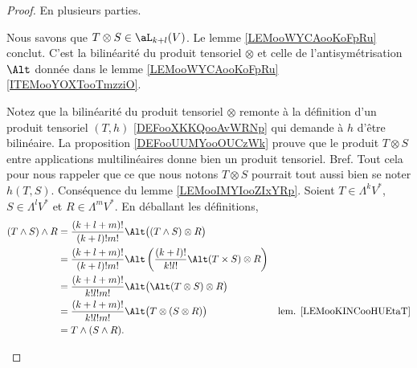 \begin{proof}
	En plusieurs parties.
	\begin{subproof}
		Nous savons que \( T\otimes S\in\aL_{k+l}(V)\). Le lemme \ref{LEMooWYCAooKoFpRu} conclut.
		C'est la bilinéarité du produit tensoriel \( \otimes\) et celle de l'antisymétrisation \( \Alt\) donnée dans le lemme \ref{LEMooWYCAooKoFpRu}\ref{ITEMooYOXTooTmzziO}.

		Notez que la bilinéarité du produit tensoriel \( \otimes\) remonte à la définition d'un produit tensoriel \( (T,h)\) \ref{DEFooXKKQooAvWRNp} qui demande à \( h\) d'être bilinéaire. La proposition \ref{DEFooUUMYooOUCzWk} prouve que le produit \( T\otimes S\) entre applications multilinéaires donne bien un produit tensoriel. Bref. Tout cela pour nous rappeler que ce que nous notons \( T\otimes S\) pourrait tout aussi bien se noter \( h(T,S)\).
		Conséquence du lemme \ref{LEMooIMYIooZIxYRp}.
		Soient \( T\in \Lambda^kV^*\), \( S\in \Lambda^lV^*\) et \( R\in \Lambda^mV^*\). En déballant les définitions,
		\begin{subequations}
			\begin{align}
				(T\wedge S)\wedge R & =\frac{ (k+l+m)! }{ (k+l)!m! }\Alt\big( (T\wedge S)\otimes R \big)                                                                     \\
				                    & =\frac{ (k+l+m)! }{ (k+l)!m! }\Alt\left( \frac{ (k+l)! }{ k!l! }\Alt(T\times S)\otimes R \right)                                       \\
				                    & =\frac{ (k+l+m)! }{ k!l!m! } \Alt\big( \Alt(T\otimes S)\otimes R \big)                                                                 \\
				                    & =\frac{ (k+l+m)! }{ k!l!m! }\Alt\big( T\otimes(S\otimes R) \big)                                 & \text{lem. \ref{LEMooKINCooHUEtaT}} \\
				                    & =T\wedge(S\wedge R).
			\end{align}
		\end{subequations}
	\end{subproof}
\end{proof}


